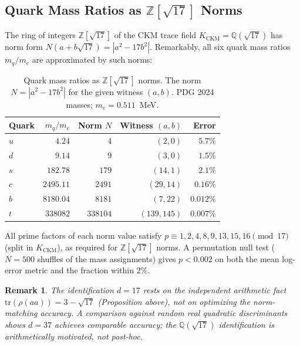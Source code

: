 \documentclass[11pt,a4paper]{article}
\newtheorem{remark}{Remark}
\begin{document}
\subsection{Quark Mass Ratios as $\mathbb{Z}[\sqrt{17}]$ Norms}
\label{subsec:quark_norms}

The ring of integers $\mathbb{Z}[\sqrt{17}]$ of the CKM trace field
$K_{\mathrm{CKM}}=\mathbb{Q}(\sqrt{17})$ has norm form
$N(a+b\sqrt{17})=|a^2-17b^2|$. Remarkably, all six quark mass ratios
$m_q/m_e$ are approximated by such norms:

\begin{table}[htbp]
\centering
\caption{Quark mass ratios as $\mathbb{Z}[\sqrt{17}]$ norms.
  The norm $N=|a^2-17b^2|$ for the given witness $(a,b)$.
  PDG 2024 masses; $m_e=0.511$~MeV.}
\label{tab:quark_norms}
\begin{tabular}{lrrrr}
\toprule
Quark & $m_q/m_e$ & Norm $N$ & Witness $(a,b)$ & Error \\
\midrule
$u$ & $4.24$     & $4$      & $(2,0)$       & $5.7\%$ \\
$d$ & $9.14$     & $9$      & $(3,0)$       & $1.5\%$ \\
$s$ & $182.78$   & $179$    & $(14,1)$      & $2.1\%$ \\
$c$ & $2495.11$  & $2491$   & $(29,14)$     & $0.16\%$ \\
$b$ & $8180.04$  & $8181$   & $(7,22)$      & $0.012\%$ \\
$t$ & $338082$   & $338104$ & $(139,145)$   & $0.007\%$ \\
\bottomrule
\end{tabular}
\end{table}

All prime factors of each norm value satisfy $p\equiv1,2,4,8,9,13,15,16
\pmod{17}$ (split in $K_{\mathrm{CKM}}$), as required for
$\mathbb{Z}[\sqrt{17}]$ norms. A permutation null test ($N=500$
shuffles of the mass assignments) gives $p<0.002$ on both the
mean log-error metric and the fraction within $2\%$.

\begin{remark}
The identification $d=17$ rests on the independent arithmetic fact
$\mathrm{tr}(\rho(aa))=3-\sqrt{17}$ (Proposition above), not on
optimizing the norm-matching accuracy. A comparison against random
real quadratic discriminants shows $d=37$ achieves comparable
accuracy; the $\mathbb{Q}(\sqrt{17})$ identification is arithmetically
motivated, not post-hoc.
\end{remark}
\end{document}
